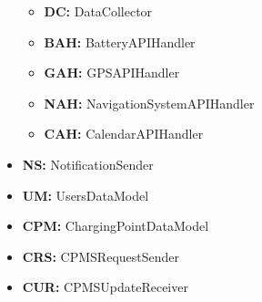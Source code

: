 \documentclass{Configuration_Files/PoliMi3i_thesis}
\begin{document}
\begin{itemize}
    \begin{itemize}
        \item \textbf{DC:} DataCollector
        \item \textbf{BAH:} BatteryAPIHandler
        \item \textbf{GAH:} GPSAPIHandler
        \item \textbf{NAH:} NavigationSystemAPIHandler
        \item \textbf{CAH:} CalendarAPIHandler
    \end{itemize}
    \item \textbf{NS:} NotificationSender
    \item \textbf{UM:} UsersDataModel
    \item \textbf{CPM:} ChargingPointDataModel
    \item \textbf{CRS:} CPMSRequestSender
    \item \textbf{CUR:} CPMSUpdateReceiver
\end{itemize}
\end{document}
